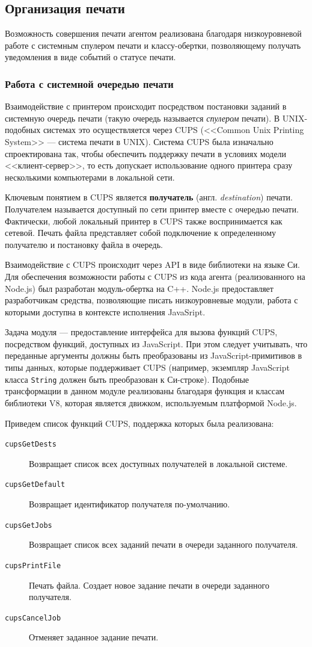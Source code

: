 \documentclass[a4paper,14pt,href,draft]{article}
\begin{document}
\subsection{Организация печати}
Возможность совершения печати агентом реализована благодаря низкоуровневой работе с системным спулером печати и классу-обертки,
позволяющему получать уведомления в виде событий о статусе печати.

\subsubsection{Работа с системной очередью печати}
Взаимодействие с принтером происходит посредством постановки заданий в системную очередь печати (такую очередь называется
\textit{спулером} печати). В UNIX-подобных системах это осуществляется через CUPS (<<Common Unix Printing System>> ---
система печати в UNIX). Система CUPS была изначально спроектирована так, чтобы обеспечить поддержку печати в условиях
модели <<клиент-сервер>>, то есть допускает использование одного принтера сразу несколькими компьютерами в локальной сети.

Ключевым понятием в CUPS является \textbf{получатель} (англ. \textit{destina\-ti\-on}) печати. Получателем называется
доступный по сети принтер вместе с очередью печати. Фактически, любой локальный принтер в CUPS также воспринимается как
сетевой. Печать файла представляет собой подключение к определенному получателю и постановку файла в очередь.

Взаимодействие с CUPS происходит через API в виде библиотеки на языке Си\cite{CUPSAPI}. Для обеспечения возможности работы с CUPS
из кода агента (реализованного на Node.js) был разработан модуль-обертка на C++. Node.js предоставляет разработчикам
средства, позволяющие писать низкоуровневые модули, работа с которыми доступна в контексте исполнения JavaSript\cite{NodeJSAddons}.

Задача модуля --- предоставление интерфейса для вызова функций CUPS, посредством функций, доступных из JavaScript.
При этом следует учитывать, что переданные аргументы должны быть преобразованы из JavaScript-примитивов в типы данных,
которые поддерживает CUPS (например, экземпляр JavaScript класса \texttt{String} должен быть преобразован к Си-строке).
Подобные трансформации в данном модуле реализованы благодаря функция и классам библиотеки V8, которая является движком,
используемым платформой Node.js.

Приведем список функций CUPS, поддержка которых была реализована:
\begin{description}
  \item[\texttt{cupsGetDests}] Возвращает список всех доступных получателей в локальной системе.
  \item[\texttt{cupsGetDefault}] Возвращает идентификатор получателя по-умолчанию.
  \item[\texttt{cupsGetJobs}] Возвращает список всех заданий печати в очереди заданного получателя.
  \item[\texttt{cupsPrintFile}] Печать файла. Создает новое задание печати в очереди заданного получателя.
  \item[\texttt{cupsCancelJob}] Отменяет заданное задание печати.
\end{description}
\end{document}
